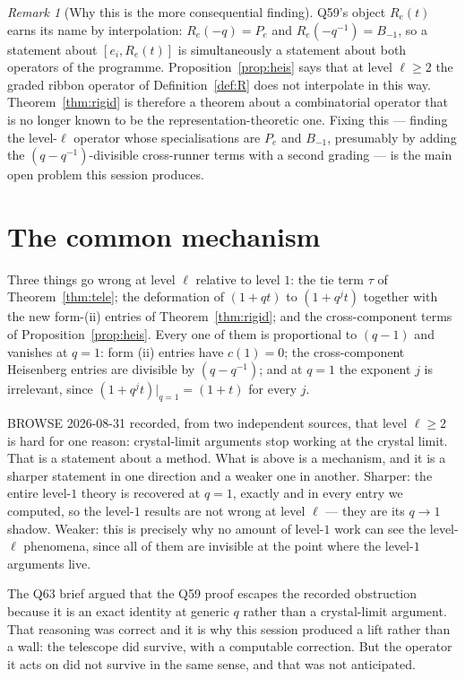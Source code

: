 \documentclass[11pt]{article}
\theoremstyle{definition}
\theoremstyle{remark}
\newtheorem{remark}[theorem]{Remark}
\begin{document}
\begin{remark}[Why this is the more consequential finding]
Q59's object $R_e(t)$ earns its name by interpolation: $R_e(-q)=P_e$ and
$R_e(-q^{-1})=B_{-1}$, so a statement about $[e_i,R_e(t)]$ is simultaneously a statement
about both operators of the programme. Proposition~\ref{prop:heis} says that at level
$\ell\ge2$ the graded ribbon operator of Definition~\ref{def:R} does not interpolate in
this way. Theorem~\ref{thm:rigid} is therefore a theorem about a combinatorial operator
that is no longer known to be the representation-theoretic one. Fixing this --- finding
the level-$\ell$ operator whose specialisations are $P_e$ and $B_{-1}$, presumably by
adding the $(q-q^{-1})$-divisible cross-runner terms with a second grading --- is the
main open problem this session produces.
\end{remark}

\section{The common mechanism}

Three things go wrong at level $\ell$ relative to level $1$:
the tie term $\tau$ of Theorem~\ref{thm:tele}; the deformation of $(1+qt)$ to
$(1+q^{j}t)$ together with the new form-(ii) entries of Theorem~\ref{thm:rigid}; and the
cross-component terms of Proposition~\ref{prop:heis}. Every one of them is proportional
to $(q-1)$ and vanishes at $q=1$: form (ii) entries have $c(1)=0$; the cross-component
Heisenberg entries are divisible by $(q-q^{-1})$; and at $q=1$ the exponent $j$ is
irrelevant, since $(1+q^{j}t)\big|_{q=1}=(1+t)$ for every $j$.

BROWSE 2026-08-31 recorded, from two independent sources, that level $\ell\ge2$ is hard
for one reason: crystal-limit arguments stop working at the crystal limit. That is a
statement about a method. What is above is a mechanism, and it is a sharper statement in
one direction and a weaker one in another. Sharper: the entire level-$1$ theory is
recovered at $q=1$, exactly and in every entry we computed, so the level-$1$ results are
not wrong at level $\ell$ --- they are its $q\to1$ shadow. Weaker: this is precisely why
no amount of level-$1$ work can see the level-$\ell$ phenomena, since all of them are
invisible at the point where the level-$1$ arguments live.

The Q63 brief argued that the Q59 proof escapes the recorded obstruction because it is
an exact identity at generic $q$ rather than a crystal-limit argument. That reasoning
was correct and it is why this session produced a lift rather than a wall: the
telescope did survive, with a computable correction. But the operator it acts on did
not survive in the same sense, and that was not anticipated.
\end{document}
